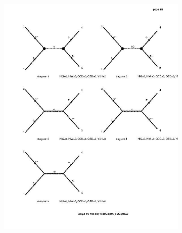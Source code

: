 \documentclass{CUP-JNL-DTM}%
\theoremstyle{definition}
\numberwithin{equation}{section}
\begin{document}
\begin{figure}[H]
    \begin{subfigure}{.5\textwidth}
      \centering
      \includegraphics[width=1\linewidth]{img/dy_bsm_diag.jpg}
      \label{fig:bsm_dy1}
    \end{subfigure}%
    \begin{subfigure}{.5\textwidth}
      \centering

\end{subfigure}
\end{figure}
\end{document}

